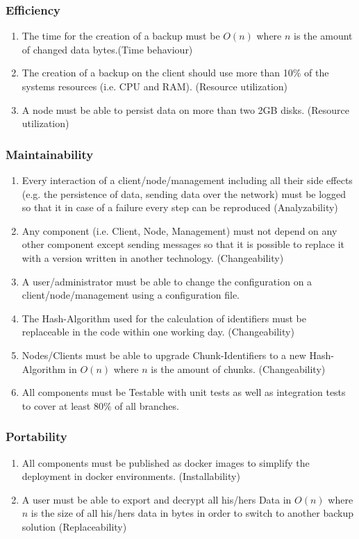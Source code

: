 \subsubsection{Efficiency}
\begin{enumerate}
	\enumcountrestore
	\item The time for the creation of a backup must be $O(n)$ where $n$ is the amount of changed data bytes.(Time behaviour)
	\item The creation of a backup on the client should use more than 10\% of the systems resources (i.e. CPU and RAM). (Resource utilization)
	\item A node must be able to persist data on more than two 2GB disks. (Resource utilization)
	\enumcountsave
\end{enumerate}

\subsubsection{Maintainability}
\begin{enumerate}
	\enumcountrestore
	\item Every interaction of a client/node/management including all their side effects (e.g. the persistence of data, sending data over the network) must be logged so that it in case of a failure every step can be reproduced (Analyzability)
	\item Any component (i.e. Client, Node, Management) must not depend on any other component except sending messages so that it is possible to replace it with a version written in another technology. (Changeability)
	\item A user/administrator must be able to change the configuration on a client/node/management using a configuration file.
	\item The Hash-Algorithm used for the calculation of identifiers must be replaceable in the code within one working day. (Changeability)
	\item Nodes/Clients must be able to upgrade Chunk-Identifiers to a new Hash-Algorithm in $O(n)$ where $n$ is the amount of chunks. (Changeability)
	\item All components must be Testable with unit tests as well as integration tests to cover at least 80\% of all branches.
	\enumcountsave
\end{enumerate}

\subsubsection{Portability}

\begin{enumerate}
	\enumcountrestore
	\item All components must be published as docker images to simplify the deployment in docker environments. (Installability)
	\item A user must be able to export and decrypt all his/hers Data in $O(n)$ where $n$ is the size of all his/hers data in bytes in order to switch to another backup solution (Replaceability)
	\enumcountsave
\end{enumerate}
